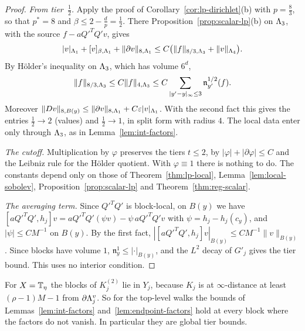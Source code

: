 \begin{proof}
\emph{From tier~$\frac12$.} Apply the proof of Corollary~\ref{cor:lp-dirichlet}(b) with $p=\frac83$, so that $p^*=8$ and $\beta\le2-\frac dp=\frac12$. There Proposition~\ref{prop:scalar-lp}(b) on $\Lambda_3$, with the source $f-aQ'^TQ'v$, gives
\[
|v|_{\Lambda_1}+[v]_{\beta,\Lambda_1}+\|\partial v\|_{8,\Lambda_1}\le C\big(\|f\|_{8/3,\Lambda_3}+\|v\|_{\Lambda_4}\big).
\]
By H\"older's inequality on $\Lambda_3$, which has volume $6^d$,
\[
\|f\|_{8/3,\Lambda_3}\le C\|f\|_{4,\Lambda_3}\le C\sum_{|y'-y|_\infty\le3}\mathfrak n^{1/2}_{y'}(f).
\] Moreover $\|Dv\|_{8,B(y)}\le\|\partial v\|_{8,\Lambda_1}+C\varepsilon|v|_{\Lambda_1}$. With the second fact this gives the entries $\frac12\to2$ (values) and $\frac12\to1$, in split form with radius $4$. The local data enter only through $\Lambda_3$, as in Lemma~\ref{lem:int-factors}.

\emph{The cutoff.} Multiplication by $\varphi$ preserves the tiers $t\le2$, by $|\varphi|+|\partial\varphi|\le C$ and the Leibniz rule for the H\"older quotient. With $\varphi\equiv1$ there is nothing to do. The constants depend only on those of Theorem~\ref{thm:lp-local}, Lemma~\ref{lem:local-sobolev}, Proposition~\ref{prop:scalar-lp} and Theorem~\ref{thm:reg-scalar}.

\emph{The averaging term.} Since $Q'^TQ'$ is block-local, on $B(y)$ we have $[aQ'^TQ',h_j]v=aQ'^TQ'(\psi v)-\psi\,aQ'^TQ'v$ with $\psi=h_j-h_j(c_y)$, and $|\psi|\le CM^{-1}$ on $B(y)$. By the first fact, $|[aQ'^TQ',h_j]v|_{B(y)}\le CM^{-1}\|v\|_{B(y)}$. Since blocks have volume $1$, $\mathfrak n^1_y\le|\cdot|_{B(y)}$, and the $L^2$ decay of $G'_j$ gives the tier bound. This uses no interior condition.
\end{proof}

For $X=\mathbb T_\eta$ the blocks of $K_j^{(2)}$ lie in $Y_j$, because $K_j$ is at $\infty$-distance at least $(\rho-1)M-1$ from $\partial\Lambda^v_j$. So for the top-level walks the bounds of Lemmas~\ref{lem:int-factors} and~\ref{lem:endpoint-factors} hold at every block where the factors do not vanish. In particular they are global tier bounds.

